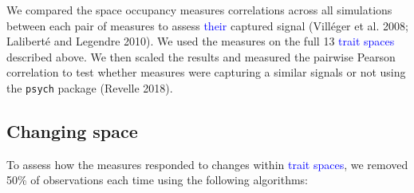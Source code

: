 \documentclass[]{article}
\begin{document}
We compared the space occupancy measures correlations across all
simulations between each pair of measures to assess
\textcolor{blue}{their} captured signal (Villéger et al.
2008; Laliberté and Legendre 2010). We used the measures on the full 13
\textcolor{blue}{trait spaces} described above. We then
scaled the results and measured the pairwise Pearson correlation to test
whether measures were capturing a similar signals or not using the
\texttt{psych} package (Revelle 2018).

\subsection{Changing space}\label{changing-spaces}

To assess how the measures responded to changes within
\textcolor{blue}{trait spaces}, we removed 50\% of
observations each time using the following algorithms:
\end{document}
